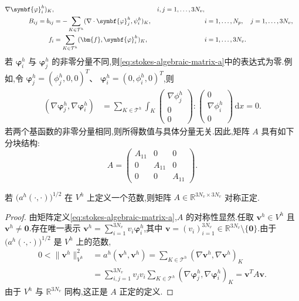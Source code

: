 \begin{note}[代数鞍点问题的推导]
\begin{align}
        \nabla\symbf{\varphi}_i^h)_K,
  &&i,j=1,\ldots,3N_v,\label{eq:stokes-algebraic-matrix-a}\\
  B_{ij}=b_{ij}
   &=-\sum_{K\in\mathcal{T}^h}
       (\nabla\cdot\symbf{\varphi}_j^h,\psi_i^h)_K,
  &&i=1,\ldots,N_p,\quad j=1,\ldots,3N_v,\label{eq:stokes-algebraic-matrix-b}\\
  f_i&=\sum_{K\in\mathcal{T}^h}(\bm{f},\symbf{\varphi}_i^h)_K,
  &&i=1,\ldots,3N_v.\notag
\end{align}
若 $\symbf{\varphi}_i^h$ 与 $\symbf{\varphi}_j^h$ 的非零分量不同,则\cref{eq:stokes-algebraic-matrix-a}中的表达式为零.例如,令
$\symbf{\varphi}_j^h=(\phi_j^h,0,0)^T$、
$\symbf{\varphi}_i^h=(0,\phi_i^h,0)^T$,则
\[
\begin{aligned}
  (\nabla\symbf{\varphi}_j^h,\nabla\symbf{\varphi}_i^h)
  &=\sum_{K\in\mathcal{T}^h}\int_K
    \begin{pmatrix}\nabla\phi_j^h\\0\\0\end{pmatrix}
    :\begin{pmatrix}0\\\nabla\phi_i^h\\0\end{pmatrix}
       \,\mathrm{d}x=0.
\end{aligned}
\]
若两个基函数的非零分量相同,则所得数值与具体分量无关.因此,矩阵 $A$ 具有如下分块结构:
\begin{equation}\label{eq:stokes-algebraic-matrix-a-block}
  A=\begin{pmatrix}
      A_{11}&0&0\\0&A_{11}&0\\0&0&A_{11}
    \end{pmatrix}.
\end{equation}
\end{note}

\begin{lemma}[矩阵 $A$ 的性质]\label{lem:stokes-algebraic-matrix-a}
若 $\bigl(a^h(\cdot,\cdot)\bigr)^{1/2}$ 在 $V^h$ 上定义一个范数,则矩阵 $A\in\mathbb{R}^{3N_v\times3N_v}$ 对称正定.
\end{lemma}
\begin{proof}
由矩阵定义\cref{eq:stokes-algebraic-matrix-a},$A$ 的对称性显然.任取 $\bm{v}^h\in V^h$ 且 $\bm{v}^h\ne\bm{0}$.存在唯一表示
$\bm{v}^h=\sum_{i=1}^{3N_v}v_i\symbf{\varphi}_i^h$,其中
$\bm{v}=(v_i)_{i=1}^{3N_v}\in\mathbb{R}^{3N_v}\setminus\{\bm{0}\}$.由于 $\bigl(a^h(\cdot,\cdot)\bigr)^{1/2}$ 是 $V^h$ 上的范数,
\[
\begin{aligned}
  0<\|\bm{v}^h\|_{V^h}^2
  &=a^h(\bm{v}^h,\bm{v}^h)
   =\sum_{K\in\mathcal{T}^h}(\nabla\bm{v}^h,\nabla\bm{v}^h)_K\\
  &=\sum_{i,j=1}^{3N_v}v_jv_i
       \sum_{K\in\mathcal{T}^h}
       (\nabla\symbf{\varphi}_j^h,
        \nabla\symbf{\varphi}_i^h)_K
   =\bm{v}^T A\bm{v}.
\end{aligned}
\]
由于 $V^h$ 与 $\mathbb{R}^{3N_v}$ 同构,这正是 $A$ 正定的定义.
\end{proof}

